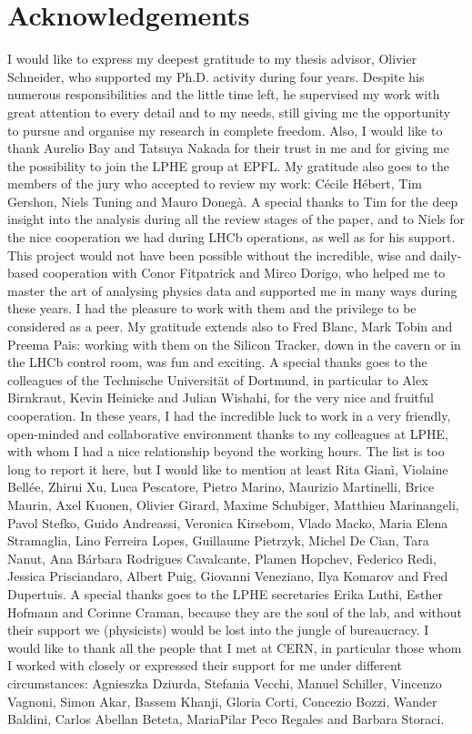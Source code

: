 \chapter*{Acknowledgements}
\vskip0.2cm
I would like to express my deepest gratitude to my thesis advisor, Olivier Schneider, 
who supported my Ph.D. activity during four years. Despite his numerous
responsibilities and the little time left, he supervised my work with 
great attention to every detail and to my needs, still giving me the
opportunity to pursue and organise my research in complete freedom.
Also, I would like to thank
Aurelio Bay and Tatsuya Nakada for their trust in me
and for giving me the possibility to join the LPHE group at EPFL.
My gratitude also goes to the members of the jury who accepted to review my
work: C\'ecile H\'ebert, Tim Gershon, Niels Tuning and Mauro Doneg\`a.
A special thanks to Tim for the deep insight into the analysis during all the review stages of the paper,
and to Niels for the nice cooperation we had during LHCb operations, as well as for his support.   
This project would not have been possible without the incredible, wise and daily-based cooperation with 
Conor Fitpatrick and Mirco Dorigo, who helped me to master the art of analysing physics data
and supported me in many ways during these years. 
I had the pleasure to work with them and the privilege to be considered as a peer.
My gratitude extends also to Fred Blanc, Mark Tobin and Preema Pais:
working with them on the Silicon Tracker, down in the cavern or in the LHCb control room, was
fun and exciting.
A special thanks goes to the colleagues of the Technische Universit\"at of Dortmund, in particular to
Alex Birnkraut, Kevin Heinicke and Julian Wishahi, for the very nice and fruitful
cooperation. 
In these years, I had the incredible luck to work in a very friendly, open-minded and
collaborative environment thanks to my colleagues at LPHE, with whom I had a nice relationship beyond the working hours. 
The list is too long to report it here, but I would like to mention at least Rita Gian\`i, Violaine Bell\'ee, 
Zhirui Xu, Luca Pescatore, Pietro Marino, Maurizio Martinelli, Brice Maurin, Axel Kuonen, Olivier Girard, Maxime Schubiger,
Matthieu Marinangeli, Pavol Stefko, Guido Andreassi, Veronica Kirsebom, Vlado Macko, Maria Elena Stramaglia, 
Lino Ferreira Lopes, Guillaume Pietrzyk, Michel De Cian, Tara Nanut, Ana B\'arbara Rodrigues Cavalcante, Plamen Hopchev,
Federico Redi, Jessica Prisciandaro, Albert Puig, Giovanni Veneziano, Ilya Komarov and Fred Dupertuis.
A special thanks goes to the LPHE secretaries Erika Luthi, Esther Hofmann and Corinne Craman, because they are the soul
of the lab, and without their support we (physicists) would be lost into the jungle of bureaucracy.  
I would like to thank all the people that I met at CERN, in particular those whom
I worked with closely or expressed their support for me under different circumstances:
Agnieszka Dziurda, Stefania Vecchi, Manuel Schiller, Vincenzo Vagnoni, Simon Akar, Bassem Khanji, Gloria Corti,
Concezio Bozzi, Wander Baldini, Carlos Abellan Beteta, MariaPilar Peco Regales and Barbara Storaci.  

